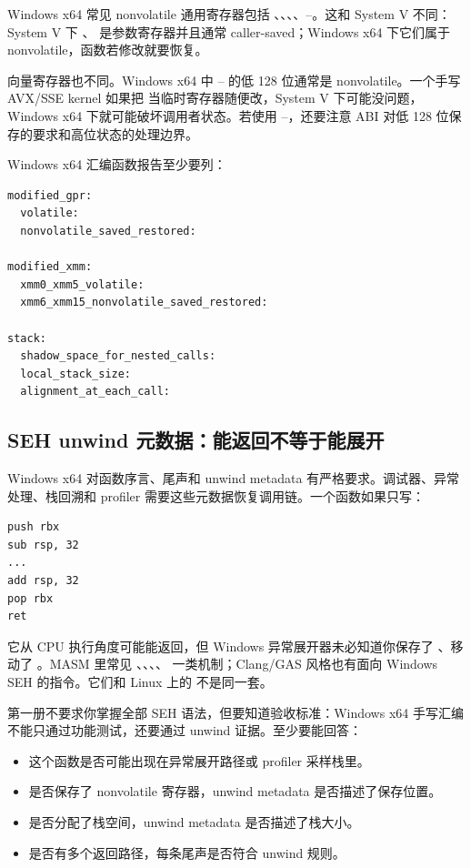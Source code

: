 Windows x64 常见 nonvolatile 通用寄存器包括 、、、、--。这和 System V 不同：System V 下 、 是参数寄存器并且通常 caller-saved；Windows x64 下它们属于 nonvolatile，函数若修改就要恢复。

向量寄存器也不同。Windows x64 中 -- 的低 128 位通常是 nonvolatile。一个手写 AVX/SSE kernel 如果把  当临时寄存器随便改，System V 下可能没问题，Windows x64 下就可能破坏调用者状态。若使用 --，还要注意 ABI 对低 128 位保存的要求和高位状态的处理边界。

Windows x64 汇编函数报告至少要列：

\begin{lstlisting}[numbers=none,caption={Windows x64 保存责任清单}]
modified_gpr:
  volatile:
  nonvolatile_saved_restored:

modified_xmm:
  xmm0_xmm5_volatile:
  xmm6_xmm15_nonvolatile_saved_restored:

stack:
  shadow_space_for_nested_calls:
  local_stack_size:
  alignment_at_each_call:
\end{lstlisting}

\subsection{SEH unwind 元数据：能返回不等于能展开}

Windows x64 对函数序言、尾声和 unwind metadata 有严格要求。调试器、异常处理、栈回溯和 profiler 需要这些元数据恢复调用链。一个函数如果只写：

\begin{lstlisting}
push rbx
sub rsp, 32
...
add rsp, 32
pop rbx
ret
\end{lstlisting}

它从 CPU 执行角度可能能返回，但 Windows 异常展开器未必知道你保存了 、移动了 。MASM 里常见 、、、、 一类机制；Clang/GAS 风格也有面向 Windows SEH 的指令。它们和 Linux 上的  不是同一套。

第一册不要求你掌握全部 SEH 语法，但要知道验收标准：Windows x64 手写汇编不能只通过功能测试，还要通过 unwind 证据。至少要能回答：

\begin{itemize}
  \item 这个函数是否可能出现在异常展开路径或 profiler 采样栈里。
  \item 是否保存了 nonvolatile 寄存器，unwind metadata 是否描述了保存位置。
  \item 是否分配了栈空间，unwind metadata 是否描述了栈大小。
  \item 是否有多个返回路径，每条尾声是否符合 unwind 规则。
\end{itemize}

